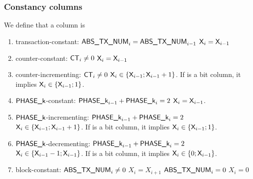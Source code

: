 \subsubsection{Constancy columns} \label{constancy_constraints}
We define that a column  is
\begin{enumerate}
    \item transaction-constant: \If $\textsf{ABS\_TX\_NUM}_{i} = \textsf{ABS\_TX\_NUM}_{i-1}$ \Then $\textsf{X}_{i} = \textsf{X}_{i-1}$
    \item counter-constant: \If $\textsf{CT}_{i} \ne 0$ \Then $\textsf{X}_{i} = \textsf{X}_{i-1}$
    \item counter-incrementing: \If $\textsf{CT}_{i} \ne 0$ \Then $\textsf{X}_{i} \in \{\textsf{X}_{i-1}; \textsf{X}_{i-1} + 1 \}$. If  is a bit column, it implies $\textsf{X}_{i} \in \{\textsf{X}_{i-1}; 1 \}$.
    \item $\textsf{PHASE\_k}$-constant: \If $\textsf{PHASE\_k}_{i-1} + \textsf{PHASE\_k}_{i} = 2$ \Then $\textsf{X}_{i} = \textsf{X}_{i-1}$.
    \item $\textsf{PHASE\_k}$-incrementing: \If $\textsf{PHASE\_k}_{i-1} + \textsf{PHASE\_k}_{i} = 2$ \Then $\textsf{X}_{i} \in \{\textsf{X}_{i-1}; \textsf{X}_{i-1} + 1 \}$. If  is a bit column, it implies $\textsf{X}_{i} \in \{\textsf{X}_{i-1}; 1 \}$.
    \item $\textsf{PHASE\_k}$-decrementing: \If $\textsf{PHASE\_k}_{i-1} + \textsf{PHASE\_k}_{i} = 2$ \Then $\textsf{X}_{i} \in \{\textsf{X}_{i-1} -1; \textsf{X}_{i-1} \}$. If  is a bit column, it implies $\textsf{X}_{i} \in \{0 ; \textsf{X}_{i-1}\}$.
    \item block-constant: \If $\textsf{ABS\_TX\_NUM}_{i} \ne 0$ \Then $X_{i} = X_{i + 1}$ \et \If $\textsf{ABS\_TX\_NUM}_{i} = 0$ \Then $X_{i} = 0$
\end{enumerate}

